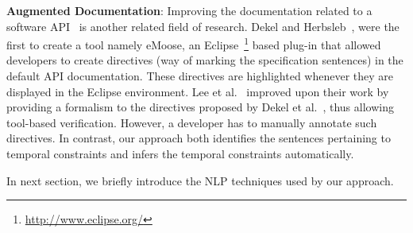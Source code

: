 \textbf{Augmented Documentation}:
Improving the documentation related to a software API~\cite{Dekel2009,tan2011acomment} is another related field of research.
Dekel and Herbsleb~\cite{Dekel2009}, were the first to create a tool namely eMoose,
an Eclipse~\footnote{\url{http://www.eclipse.org/}} based plug-in that allowed developers to create directives
(way of marking the specification sentences) in the default API documentation.
These directives are highlighted whenever they are displayed in the Eclipse environment.
Lee et al.~\cite{lee2012towards} improved upon their work by providing a formalism to the directives proposed by Dekel et al.~\cite{Dekel2009},
thus allowing tool-based verification.
However, a developer has to manually annotate such directives.
In contrast, our approach both identifies the sentences pertaining to temporal constraints and infers the temporal constraints automatically. 

In next section, we briefly introduce the NLP techniques used by our approach.
